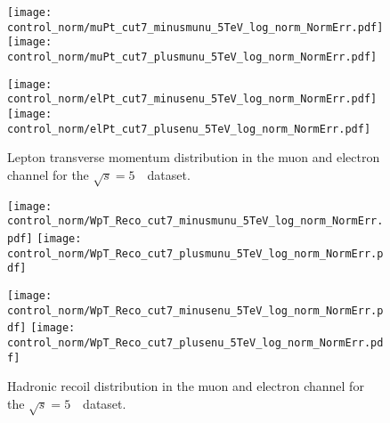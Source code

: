 \begin{figure}[h]
	\centering
	{\texttt{[image: control\_norm/muPt\_cut7\_minusmunu\_5TeV\_log\_norm\_NormErr.pdf]}\label{f:}}
	{\texttt{[image: control\_norm/muPt\_cut7\_plusmunu\_5TeV\_log\_norm\_NormErr.pdf]}\label{f:}}
	
	{\texttt{[image: control\_norm/elPt\_cut7\_minusenu\_5TeV\_log\_norm\_NormErr.pdf]}\label{f:}}
	{\texttt{[image: control\_norm/elPt\_cut7\_plusenu\_5TeV\_log\_norm\_NormErr.pdf]}\label{f:}}
	\caption{  Lepton transverse momentum distribution in the muon and electron channel  for the $\sqrt{s} = 5$~\TeV\ dataset. }\end{figure}
	\newpage
\begin{figure}[h]
	\centering
	{\texttt{[image: control\_norm/WpT\_Reco\_cut7\_minusmunu\_5TeV\_log\_norm\_NormErr.pdf]}\label{f:}}
	{\texttt{[image: control\_norm/WpT\_Reco\_cut7\_plusmunu\_5TeV\_log\_norm\_NormErr.pdf]}\label{f:}}

	{\texttt{[image: control\_norm/WpT\_Reco\_cut7\_minusenu\_5TeV\_log\_norm\_NormErr.pdf]}\label{f:}}
	{\texttt{[image: control\_norm/WpT\_Reco\_cut7\_plusenu\_5TeV\_log\_norm\_NormErr.pdf]}\label{f:}}
	\caption{  Hadronic recoil distribution in the muon and electron channel  for the $\sqrt{s} = 5$~\TeV\ dataset. }\end{figure}
	\newpage
	\clearpage
%
%

